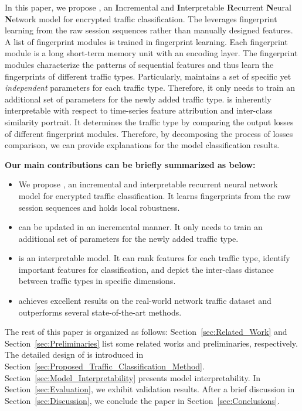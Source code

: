 In this paper, we propose \sys, an \textbf{I}ncremental and \textbf{I}nterpretable \textbf{R}ecurrent \textbf{N}eural \textbf{N}etwork model for encrypted traffic classification. 
The \sys leverages fingerprint learning from the raw session sequences rather than manually designed features. 
A list of fingerprint modules is trained in fingerprint learning. 
Each fingerprint module is a long short-term memory unit with an encoding layer. 
The fingerprint modules characterize the patterns of sequential features and thus learn the fingerprints of different traffic types.
Particularly, 
\first \sys maintains a set of specific yet \emph{independent} parameters for each traffic type. Therefore, it only needs to train an additional set of parameters for the newly added traffic type. 
\second \sys is inherently interpretable with respect to time-series feature attribution and inter-class similarity portrait. 
It determines the traffic type by comparing the output losses of different fingerprint modules.
Therefore, by decomposing the process of losses comparison, we can provide explanations for the model classification results.

\textbf{Our main contributions can be briefly summarized as below:}
\begin{itemize}
	\item We propose \sys, an incremental and interpretable recurrent neural network model for encrypted traffic classification. It learns fingerprints from the raw session sequences and holds local robustness.
	\item \sys can be updated in an incremental manner. It only needs to train an additional set of parameters for the newly added traffic type. 
	\item \sys is an interpretable model. It can rank features for each traffic type, identify important features for classification, and depict the inter-class distance between traffic types in specific dimensions. 
	\item \sys achieves excellent results on the real-world network traffic dataset and outperforms several state-of-the-art methods.
\end{itemize}

The rest of this paper is organized as follows: Section~\ref{sec:Related_Work} and Section~\ref{sec:Preliminaries} list some related works and preliminaries, respectively. 
The detailed design of \sys is introduced in Section~\ref{sec:Proposed_Traffic_Classification_Method}. 
Section~\ref{sec:Model_Interpretability} presents model interpretability.  
In Section~\ref{sec:Evaluation}, we exhibit validation results. 
After a brief discussion in Section~\ref{sec:Discussion}, we conclude the paper in Section~\ref{sec:Conclusions}.


